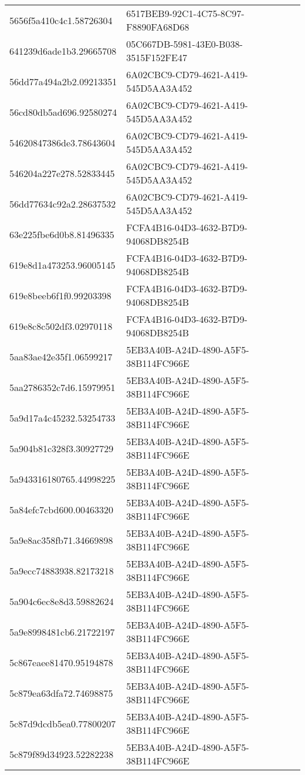 \begin{tabular}{ll}
5656f5a410c4c1.58726304 & 6517BEB9-92C1-4C75-8C97-F8890FA68D68 \\
641239d6ade1b3.29665708 & 05C667DB-5981-43E0-B038-3515F152FE47 \\
56dd77a494a2b2.09213351 & 6A02CBC9-CD79-4621-A419-545D5AA3A452 \\
56cd80db5ad696.92580274 & 6A02CBC9-CD79-4621-A419-545D5AA3A452 \\
54620847386de3.78643604 & 6A02CBC9-CD79-4621-A419-545D5AA3A452 \\
546204a227e278.52833445 & 6A02CBC9-CD79-4621-A419-545D5AA3A452 \\
56dd77634c92a2.28637532 & 6A02CBC9-CD79-4621-A419-545D5AA3A452 \\
63e225fbe6d0b8.81496335 & FCFA4B16-04D3-4632-B7D9-94068DB8254B \\
619e8d1a473253.96005145 & FCFA4B16-04D3-4632-B7D9-94068DB8254B \\
619e8beeb6f1f0.99203398 & FCFA4B16-04D3-4632-B7D9-94068DB8254B \\
619e8c8c502df3.02970118 & FCFA4B16-04D3-4632-B7D9-94068DB8254B \\
5aa83ae42e35f1.06599217 & 5EB3A40B-A24D-4890-A5F5-38B114FC966E \\
5aa2786352c7d6.15979951 & 5EB3A40B-A24D-4890-A5F5-38B114FC966E \\
5a9d17a4c45232.53254733 & 5EB3A40B-A24D-4890-A5F5-38B114FC966E \\
5a904b81c328f3.30927729 & 5EB3A40B-A24D-4890-A5F5-38B114FC966E \\
5a943316180765.44998225 & 5EB3A40B-A24D-4890-A5F5-38B114FC966E \\
5a84efc7cbd600.00463320 & 5EB3A40B-A24D-4890-A5F5-38B114FC966E \\
5a9e8ac358fb71.34669898 & 5EB3A40B-A24D-4890-A5F5-38B114FC966E \\
5a9ecc74883938.82173218 & 5EB3A40B-A24D-4890-A5F5-38B114FC966E \\
5a904c6ec8e8d3.59882624 & 5EB3A40B-A24D-4890-A5F5-38B114FC966E \\
5a9e8998481cb6.21722197 & 5EB3A40B-A24D-4890-A5F5-38B114FC966E \\
5c867eaee81470.95194878 & 5EB3A40B-A24D-4890-A5F5-38B114FC966E \\
5c879ea63dfa72.74698875 & 5EB3A40B-A24D-4890-A5F5-38B114FC966E \\
5c87d9dcdb5ea0.77800207 & 5EB3A40B-A24D-4890-A5F5-38B114FC966E \\
5c879f89d34923.52282238 & 5EB3A40B-A24D-4890-A5F5-38B114FC966E \\

\end{tabular}
